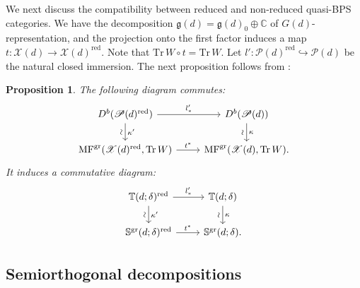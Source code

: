 \documentclass [11pt,oneside,a4paper,mathscr]{amsart}
\newtheorem{prop}[thm]{Proposition}
\theoremstyle{definition}
\newcommand{\X}{\mathscr{X}}
\begin{document}
We next discuss the compatibility between reduced and non-reduced quasi-BPS categories. 
We have 
the decomposition 
$\mathfrak{g}(d)= \mathfrak{g}(d)_0\oplus \mathbb{C}$
of $G(d)$-representation, and the projection onto the first factor induces a map $t\colon \X(d)\to \X(d)^{\mathrm{red}}$. Note that $\mathrm{Tr}\,W \circ t=\mathrm{Tr}\,W$. Let $l'\colon \mathscr{P}(d)^{\mathrm{red}}\hookrightarrow \mathscr{P}(d)$
be the natural closed immersion. The next proposition follows from \cite[Lemma 2.4.4]{T}:

\begin{prop}\label{redunred}
    The following diagram commutes:
    \begin{equation*}
        \begin{tikzcd}
            D^b(\mathscr{P}(d)^{\mathrm{red}})\arrow[d, "\sim" {anchor=south, rotate=90}, "\kappa'"]\arrow[r, "l'_*"]& D^b(\mathscr{P}(d))\arrow[d, "\sim" {anchor=south, rotate=90}, "\kappa"]\\
            \mathrm{MF}^{\mathrm{gr}}(\X(d)^{\mathrm{red}}, \mathrm{Tr}\,W)\arrow[r, "t^*"]& \mathrm{MF}^{\mathrm{gr}}(\X(d), \mathrm{Tr}\,W).
        \end{tikzcd}
    \end{equation*}
    It induces a commutative diagram:
    \begin{equation*}
        \begin{tikzcd}
            \mathbb{T}(d; \delta)^{\mathrm{red}}\arrow[d, "\sim" {anchor=south, rotate=90}, "\kappa'"]\arrow[r, "l'_*"]& \mathbb{T}(d; \delta)\arrow[d, "\sim" {anchor=south, rotate=90}, "\kappa"]\\
            \mathbb{S}^{\mathrm{gr}}(d; \delta)^{\mathrm{red}}\arrow[r, "t^*"]& \mathbb{S}^{\mathrm{gr}}(d; \delta).
        \end{tikzcd}
    \end{equation*}
\end{prop}


\subsection{Semiorthogonal decompositions}\label{subsec:sod}
\end{document}

